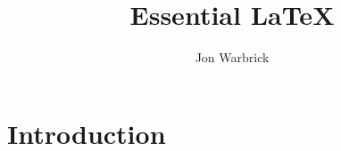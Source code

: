 ﻿%






\newlength{\egwidth}\setlength{\egwidth}{0.42\textwidth}

\newenvironment{eg}%
{\begin{list}{}{\setlength{\leftmargin}{0.05\textwidth}%
\setlength{\rightmargin}{\leftmargin}}\item[]\footnotesize}%
{\end{list}}

\newenvironment{egbox}%
{\begin{minipage}[t]{\egwidth}}%
{\end{minipage}}

\newcommand{\egstart}{\begin{eg}\begin{egbox}}
\newcommand{\egmid}{\end{egbox}\hfill\begin{egbox}}
\newcommand{\egend}{\end{egbox}\end{eg}}


\newcommand{\fn}[1]{\hbox{\tt #1}}
\newcommand{\llo}[1]{(see line #1)}
\newcommand{\lls}[1]{(see lines #1)}
\newcommand{\bs}{$\backslash$}

\title{Essential \LaTeX}
\author{Jon Warbrick}



\maketitle

\section{Introduction}

